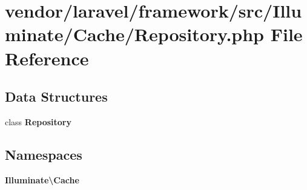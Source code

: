 \section{vendor/laravel/framework/src/\+Illuminate/\+Cache/\+Repository.php File Reference}
\label{_cache_2_repository_8php}
\subsection*{Data Structures}
\begin{DoxyCompactItemize}
\item 
class {\bf Repository}
\end{DoxyCompactItemize}
\subsection*{Namespaces}
\begin{DoxyCompactItemize}
\item 
 {\bf Illuminate\textbackslash{}\+Cache}
\end{DoxyCompactItemize}
